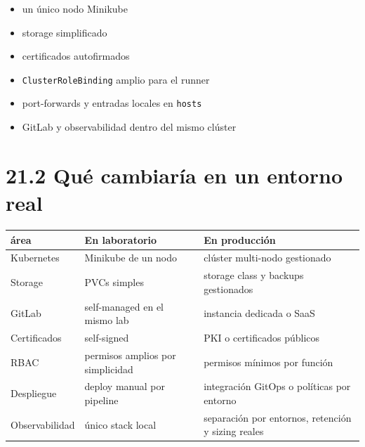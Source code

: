 \documentclass[
a4paper,
12pt]{report}
\providecommand{\tightlist}{%
  \setlength{\itemsep}{0pt}\setlength{\parskip}{0pt}}
\begin{document}
\begin{itemize}
\tightlist
\item
  un único nodo Minikube
\item
  storage simplificado
\item
  certificados autofirmados
\item
  \texttt{ClusterRoleBinding} amplio para el runner
\item
  port-forwards y entradas locales en \texttt{hosts}
\item
  GitLab y observabilidad dentro del mismo clúster
\end{itemize}

\section{21.2 Qué cambiaría en un entorno
real}\label{quuxe9-cambiaruxeda-en-un-entorno-real}

{\def\LTcaptype{table} %
\begin{longtable}[]{@{}
  >{\raggedright\arraybackslash}p{}
  >{\raggedright\arraybackslash}p{}
  >{\raggedright\arraybackslash}p{}@{}}
\toprule\noalign{}
\begin{minipage}[b]{\linewidth}\raggedright
área
\end{minipage} & \begin{minipage}[b]{\linewidth}\raggedright
En laboratorio
\end{minipage} & \begin{minipage}[b]{\linewidth}\raggedright
En producción
\end{minipage} \\
\midrule\noalign{}
\endhead
\bottomrule\noalign{}
\endlastfoot
Kubernetes & Minikube de un nodo & clúster multi-nodo gestionado \\
Storage & PVCs simples & storage class y backups gestionados \\
GitLab & self-managed en el mismo lab & instancia dedicada o SaaS \\
Certificados & self-signed & PKI o certificados públicos \\
RBAC & permisos amplios por simplicidad & permisos mínimos por
función \\
Despliegue & deploy manual por pipeline & integración GitOps o políticas
por entorno \\
Observabilidad & único stack local & separación por entornos, retención
y sizing reales \\
\end{longtable}
}
\end{document}
